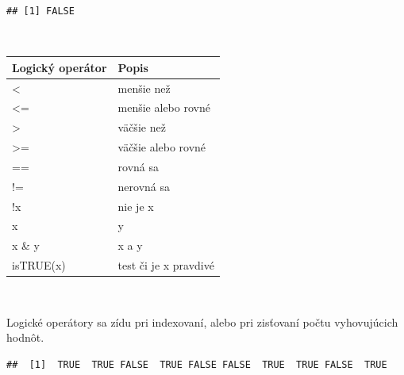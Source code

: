 \begin{verbatim}
## [1] FALSE
\end{verbatim}

~

\begin{longtable}[]{@{}ll@{}}
\toprule
Logický operátor & Popis\tabularnewline
\midrule
\endhead
\textless{} & menšie než\tabularnewline
\textless= & menšie alebo rovné\tabularnewline
\textgreater{} & väčšie než\tabularnewline
\textgreater= & väčšie alebo rovné\tabularnewline
== & rovná sa\tabularnewline
!= & nerovná sa\tabularnewline
!x & nie je x\tabularnewline
x & y\tabularnewline
x \& y & x a y\tabularnewline
isTRUE(x) & test či je x pravdivé\tabularnewline
\bottomrule
\end{longtable}

~

Logické operátory sa zídu pri indexovaní, alebo pri zisťovaní počtu
vyhovujúcich hodnôt.

\begin{Shaded}
\begin{Highlighting}[]

\StringTok{ }\NormalTok{(} \OperatorTok{:}\NormalTok{, } \NormalTok{, } \NormalTok{)}


\NormalTok{ <-}\StringTok{ }\OperatorTok{>}\StringTok{ }


\NormalTok{)}
\end{Highlighting}
\end{Shaded}

\begin{verbatim}
##  [1]  TRUE  TRUE FALSE  TRUE FALSE FALSE  TRUE  TRUE FALSE  TRUE
\end{verbatim}

\begin{Shaded}
\begin{Highlighting}[]

\NormalTok{)}
\end{Highlighting}
\end{Shaded}

